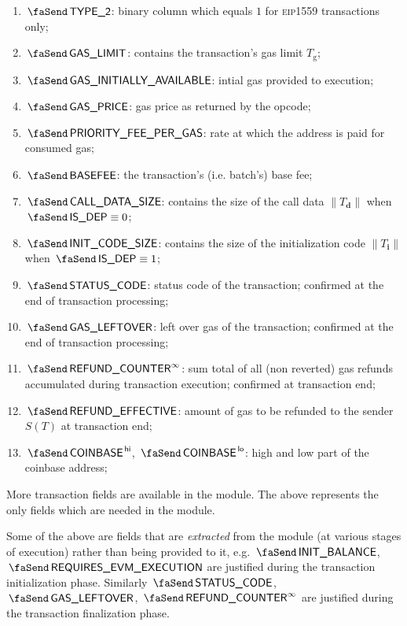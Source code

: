 \begin{enumerate}
	\item $\txIsTypeTwo$:
		\godGiven{}
		binary column which equals $1$ for \textsc{eip1559} transactions only;
	\item $\txGasLimit$:
		\godGiven{}
		contains the transaction's gas limit $T_\text{g}$;
	\item $\txInitialGas$:
		\godGiven{}
		intial gas provided to execution; 
	\item $\txGasPrice$:
		\godGiven{}
		gas price as returned by the  opcode;
	\item $\txPriorityFeePerGas$:
		\godGiven{}
		rate at which the  address is paid for consumed gas;
	\item $\txBasefee$:
		\godGiven{}
		the transaction's (i.e. batch's) base fee;
	\item $\txCallDataSize$:
		\godGiven{}
		contains the size of the call data $\|T_\textbf{d}\|$ when $\txIsDeployment \equiv 0$;
	\item $\txInitCodeSize$:
		\godGiven{}
		contains the size of the initialization code $\|T_\textbf{i}\|$ when $\txIsDeployment \equiv 1$;
	\item $\txStatusCode$:
		\markAsJustifiedHere{}
		\godGiven{}
		status code of the transaction; confirmed at the end of transaction processing; 
	\item $\txLeftoverGas$:
		\markAsJustifiedHere{}
		\godGiven{}
		left over gas of the transaction; confirmed at the end of transaction processing;
	\item $\txFinalRefundCounter$:
		\markAsJustifiedHere{}
		\godGiven{}
		sum total of all (non reverted) gas refunds accumulated during transaction execution; confirmed at transaction end; 
	\item $\txEffectiveRefund$:
		\godGiven{}
		amount of gas to be refunded to the sender $S(T)$ at transaction end;
	\item $\txCoinbase\high$, $\txCoinbase\low$:
		\godGiven{}
		high and low part of the coinbase address;
\end{enumerate}
\saNote{}
More transaction fields are available in the \txnDataMod{} module. The above represents the only fields which are needed in the \hubMod{} module.

\saNote{}
Some of the above are fields that are \emph{extracted} from the \hubMod{} module (at various stages of execution) rather than being provided to it, e.g. 
$\txInitialBalance$,
$\txRequiresEvmExecution$
are justified during the transaction initialization phase.
Similarly
$\txStatusCode$,
$\txLeftoverGas$,
$\txFinalRefundCounter$
are justified during the transaction finalization phase.
